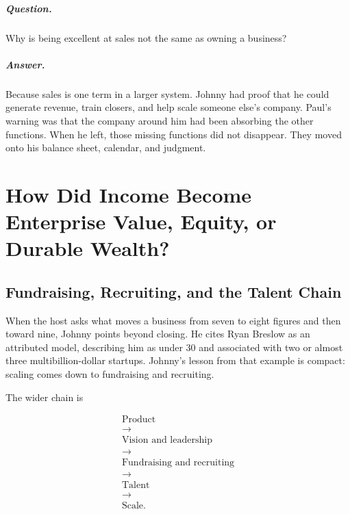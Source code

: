 \documentclass[11pt,oneside]{book}
\begin{document}
\paragraph{Question.}
Why is being excellent at sales not the same as owning a business?

\paragraph{Answer.}
Because sales is one term in a larger system. Johnny had proof that he could generate revenue, train closers, and help scale someone else's company. Paul's warning was that the company around him had been absorbing the other functions. When he left, those missing functions did not disappear. They moved onto his balance sheet, calendar, and judgment.

\chapter{How Did Income Become Enterprise Value, Equity, or Durable Wealth?}

\section{Fundraising, Recruiting, and the Talent Chain}

When the host asks what moves a business from seven to eight figures and then toward nine, Johnny points beyond closing. He cites Ryan Breslow as an attributed model, describing him as under 30 and associated with two or almost three multibillion-dollar startups. Johnny's lesson from that example is compact: scaling comes down to fundraising and recruiting.

The wider chain is

\begin{equation}
\begin{gathered}
\text{Product}\\
\longrightarrow\\
\text{Vision and leadership}\\
\longrightarrow\\
\text{Fundraising and recruiting}\\
\longrightarrow\\
\text{Talent}\\
\longrightarrow\\
\text{Scale}.
\end{gathered}
\end{equation}
\end{document}
